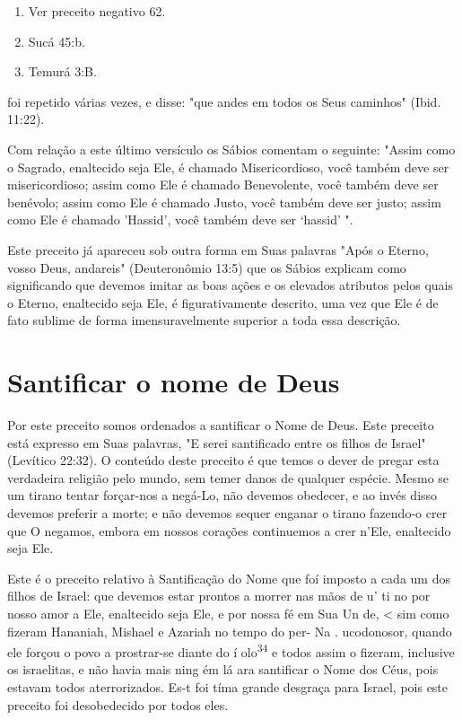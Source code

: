 \begin{itemize}
\begin{enumrate}
\begin{itemize}
\begin{enumerate}
\def\labelenumi{\arabic{enumi}.}
\setcounter{enumi}{30}
\item
 
 Ver preceito negativo 62.
 
\item
 
 Sucá 45:b.
 
\item
 
 Temurá 3:B.
 
\end{enumerate}




foi repetido várias vezes, e disse: "que andes em todos os Seus
caminhos" (Ibid. 11:22).

Com relação a este último versículo os Sábios comentam o seguinte:
"Assim como o Sagrado, enaltecido seja Ele, é chamado Misericordioso,
você também deve ser misericordioso; assim como Ele é chamado
Benevolente, vo­cê também deve ser benévolo; assim como Ele é chamado
Justo, você também deve ser justo; assim como Ele é chamado 'Hassid',
você também deve ser `hassid' ".

Este preceito já apareceu sob outra forma em Suas palavras "Após o
Eterno, vosso Deus, andareis" (Deuteronômio 13:5) que os Sábios explicam
como significando que devemos imitar as boas ações e os elevados
atributos pelos quais o Eterno, enaltecido seja Ele, é figurativamente
descrito, uma vez que Ele é de fato sublime de forma imensuravelmente
superior a toda essa descrição.


\section{Santificar o nome de Deus}


Por este preceito somos ordenados a santificar o Nome de Deus. Es­te
preceito está expresso em Suas palavras, "E serei santificado entre os
filhos de Israel" (Levítico 22:32). O conteúdo deste preceito é que
temos o dever de pregar esta verdadeira religião pelo mundo, sem temer
danos de qualquer es­pécie. Mesmo se um tirano tentar forçar-nos a
negá-Lo, não devemos obede­cer, e ao invés disso devemos preferir a
morte; e não devemos sequer enganar o tirano fazendo-o crer que O
negamos, embora em nossos corações continue­mos a crer n'Ele, enaltecido
seja Ele.

Este é o preceito relativo à Santificação do Nome que foí imposto a cada
um dos filhos de Israel: que devemos estar prontos a morrer nas mãos de
u' ti no por nosso amor a Ele, enaltecido seja Ele, e por nossa fé em
Sua Un de, \textless{} sim como fizeram Hananiah, Mishael e Azariah no
tempo do per-
 Na . ucodonosor, quando ele forçou o povo a prostrar-se diante do í
 olo\textsuperscript{34} e todos assim o fizeram, inclusive os
 israelitas, e não havia mais nin­g ém lá ara santificar o Nome dos
 Céus, pois estavam todos aterrorizados. Es-t foi tíma grande desgraça
 para Israel, pois este preceito foi desobedecido por todos eles.


\end{itemize}
\end{enumrate}
\end{itemize}
